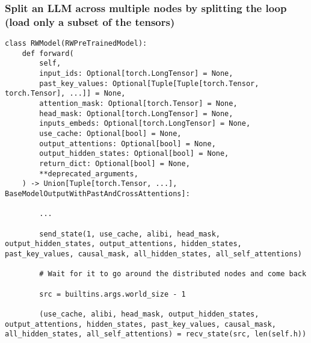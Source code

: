 \documentclass{beamer}
\begin{document}
\begin{frame}[fragile]
\frametitle{Split an LLM across multiple nodes by splitting the loop (load only a subset of the tensors)}
\tiny\begin{verbatim}
class RWModel(RWPreTrainedModel):
    def forward(
        self,
        input_ids: Optional[torch.LongTensor] = None,
        past_key_values: Optional[Tuple[Tuple[torch.Tensor, torch.Tensor], ...]] = None,
        attention_mask: Optional[torch.Tensor] = None,
        head_mask: Optional[torch.LongTensor] = None,
        inputs_embeds: Optional[torch.LongTensor] = None,
        use_cache: Optional[bool] = None,
        output_attentions: Optional[bool] = None,
        output_hidden_states: Optional[bool] = None,
        return_dict: Optional[bool] = None,
        **deprecated_arguments,
    ) -> Union[Tuple[torch.Tensor, ...], BaseModelOutputWithPastAndCrossAttentions]:

        ...

        send_state(1, use_cache, alibi, head_mask, output_hidden_states, output_attentions, hidden_states, past_key_values, causal_mask, all_hidden_states, all_self_attentions)

        # Wait for it to go around the distributed nodes and come back

        src = builtins.args.world_size - 1

        (use_cache, alibi, head_mask, output_hidden_states, output_attentions, hidden_states, past_key_values, causal_mask, all_hidden_states, all_self_attentions) = recv_state(src, len(self.h))
\end{verbatim}
\end{frame}
\end{document}
